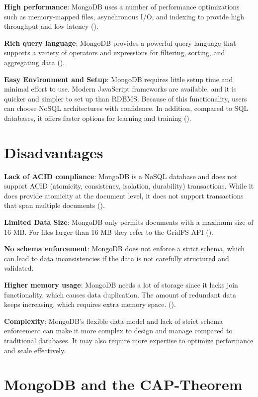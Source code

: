 \textbf{High performance}: MongoDB uses a number of performance optimizations such as memory-mapped files, asynchronous I/O, and indexing to provide high throughput and low latency (\cites{mongodb-performance}{knowledgenile-pro-con}).

\textbf{Rich query language}: MongoDB provides a powerful query language that supports a variety of operators and expressions for filtering, sorting, and aggregating data (\cite{mongodb-query}).

\textbf{Easy Environment and Setup}: MongoDB requires little setup time and minimal effort to use. Modern JavaScript frameworks are available, and it is quicker and simpler to set up than RDBMS.
Because of this functionality, users can choose NoSQL architectures with confidence. In addition, compared to SQL databases, it offers faster options for learning and training (\cites{knowledgenile-pro-con}{jamsheer_2019}). 

\section{Disadvantages}
\textbf{Lack of ACID compliance}: MongoDB is a NoSQL database and does not support ACID (atomicity, consistency, isolation, durability) transactions. While it does provide atomicity at the document level, it does not support transactions that span multiple documents (\cites{mongodb-transactions}{knowledgenile-pro-con}).

\textbf{Limited Data Size}: MongoDB only permits documents with a maximum size of 16 MB. For files larger than 16 MB they refer to the GridFS API (\cite{mongodb-documents}).

\textbf{No schema enforcement}: MongoDB does not enforce a strict schema, which can lead to data inconsistencies if the data is not carefully structured and validated.

\textbf{Higher memory usage}: MongoDB needs a lot of storage since it lacks join functionality, which causes data duplication. The amount of redundant data keeps increasing, which requires extra memory space. (\cite{knowledgenile-pro-con}).

\textbf{Complexity}: MongoDB's flexible data model and lack of strict schema enforcement can make it more complex to design and manage compared to traditional databases. It may also require more expertise to optimize performance and scale effectively.

\pagebreak
\section{MongoDB and the CAP-Theorem}

